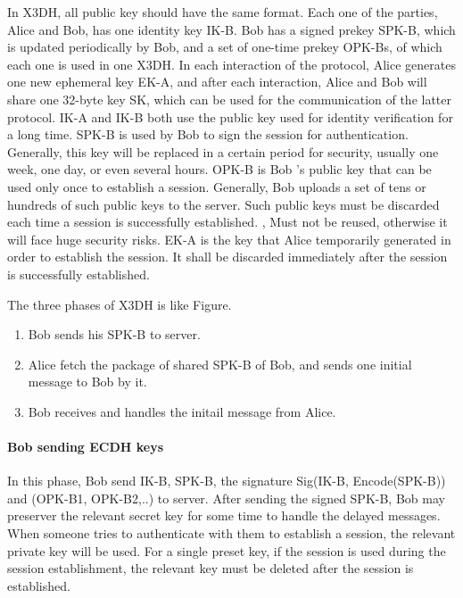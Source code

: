 \documentclass[11pt,en]{elegantpaper}
\begin{document}
In X3DH, all public key should have the same format. Each one of the parties, Alice and Bob, has one identity key IK-B. Bob has a signed prekey SPK-B, which is updated periodically by Bob, and a set of one-time prekey OPK-Bs, of which each one is used in one X3DH. In each interaction of the protocol, Alice generates one new ephemeral key EK-A, and after each interaction, Alice and Bob will share one 32-byte key SK, which can be used for the communication of the latter protocol. IK-A and IK-B both use the public key used for identity verification for a long time. SPK-B is used by Bob to sign the session for authentication. Generally, this key will be replaced in a certain period for security, usually one week, one day, or even several hours. OPK-B is Bob ’s public key that can be used only once to establish a session. Generally, Bob uploads a set of tens or hundreds of such public keys to the server. Such public keys must be discarded each time a session is successfully established. , Must not be reused, otherwise it will face huge security risks. EK-A is the key that Alice temporarily generated in order to establish the session. It shall be discarded immediately after the session is successfully established.

The three phases of X3DH is like Figure.

\begin{enumerate}
    \item Bob sends his SPK-B to server.
    \item Alice fetch the package of shared SPK-B of Bob, and sends one initial message to Bob by it.
    \item Bob receives and handles the initail message from Alice.
\end{enumerate}

\paragraph{Bob sending ECDH keys}
In this phase, Bob send IK-B, SPK-B, the signature Sig(IK-B, Encode(SPK-B)) and (OPK-B1, OPK-B2,..) to server. After sending the signed SPK-B, Bob may preserver the relevant secret key for some time to handle the delayed messages. When someone tries to authenticate with them to establish a session, the relevant private key will be used. For a single preset key, if the session is used during the session establishment, the relevant key must be deleted after the session is established.
\end{document}
